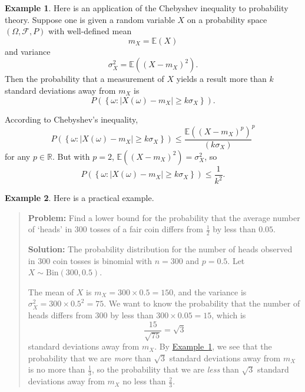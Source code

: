 \documentclass[a4paper]{scrartcl}
\newcommand{\R}{\mathbb{R}}
\theoremstyle{definition}
\newtheorem{example}{Example}[section]
\theoremstyle{plain}
\theoremstyle{remark}
\begin{document}
\begin{example}
  \label{eg:chebyshevinequalityandprobability}
  Here is an application of the Chebyshev inequality to probability theory. Suppose one is given a random variable $X$ on a probability space $(\Omega, \mathcal{F}, P)$ with well-defined mean
  \begin{equation*}
    m_{X} = \mathbb{E}(X)
  \end{equation*}
  and variance
  \begin{equation*}
    \sigma_{X}^{2} = \mathbb{E}\left( {(X - m_{X})}^{2} \right).
  \end{equation*}
  Then the probability that a measurement of $X$ yields a result more than $k$ standard deviations away from $m_{X}$ is
  \begin{equation*}
    P(\left\{ \omega\colon \left| X(\omega) - m_{X} \right| \geq k\sigma_{X} \right\}).
  \end{equation*}

  According to Chebyshev's inequality,
  \begin{equation*}
    P(\left\{ \omega\colon \left| X(\omega) - m_{X} \right| \geq k\sigma_{X} \right\}) \leq  \frac{\mathbb{E}({(X - m_{X})}^{p})}{(k\sigma_{X})}^{p}
  \end{equation*}
  for any $p \in \R$. But with $p = 2$, $\mathbb{E}({(X - m_{X})}^{2}) = \sigma_{X}^{2}$, so
  \begin{equation*}
    P(\left\{ \omega\colon \left| X(\omega) - m_{X} \right| \geq k\sigma_{X} \right\}) \leq \frac{1}{k^{2}}.
  \end{equation*}
\end{example}

\begin{example}
  Here is a practical example.
  \begin{quote}
    \textbf{Problem:} Find a lower bound for the probability that the average number of `heads' in 300 tosses of a fair coin differs from $\frac{1}{2}$ by less than $0.05$.

    \textbf{Solution:} The probability distribution for the number of heads observed in 300 coin tosses is binomial with $n = 300$ and $p = 0.5$. Let $X \sim \mathrm{Bin}(300, 0.5)$.

    The mean of $X$ is $m_{X} = 300 \times 0.5 = 150$, and the variance is $\sigma_{X}^{2} = 300\times 0.5^{2} = 75$. We want to know the probability that the number of heads differs from 300 by less than $300 \times 0.05 = 15$, which is
    \begin{equation*}
      \frac{15}{\sqrt{75}} = \sqrt{3}
    \end{equation*}
    standard deviations away from $m_{X}$. By \hyperref[eg:chebyshevinequalityandprobability]{Example~\ref*{eg:chebyshevinequalityandprobability}}, we see that the probability that we are \emph{more} than $\sqrt{3}$ standard deviations away from $m_{X}$ is no more than $\frac{1}{3}$, so the probability that we are \emph{less} than $\sqrt{3}$ standard deviations away from $m_{X}$ no less than $\frac{2}{3}$.
  \end{quote}
\end{example}
\end{document}
